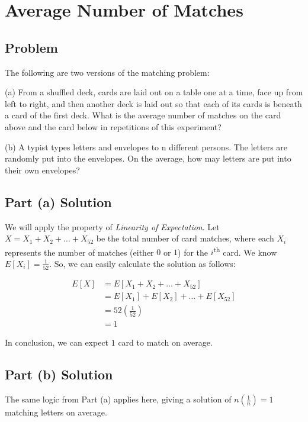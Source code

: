 \documentclass{article}
\date{}
\author{Kaan Aksoy | March 12, 2020}
\begin{document}
\maketitle
\section{Average Number of Matches}

\subsection{Problem}
The following are two versions of the matching problem:

(a) From a shuffled deck, cards are laid out on a table 
one at a time, face up from left to right, and then another 
deck is laid out so that each of its cards is beneath a 
card of the first deck. What is the average number of 
matches on the card above and the card below in repetitions 
of this experiment?

(b) A typist types letters and envelopes to n different persons. 
The letters are randomly put into the envelopes. On the 
average, how may letters are put into their own envelopes?				

\subsection{Part (a) Solution}

We will apply the property of \textit{Linearity of Expectation}.
Let $X = X_1 + X_2 + \ldots + X_{52}$ be the total number of 
card matches, where each $X_i$ represents the number of 
matches (either $0$ or $1$) for the $i$\textsuperscript{th} 
card. We know $E[X_i] = \frac{1}{52}$. So, we can easily 
calculate the solution as follows:

\begin{equation*}
\begin{split}
E[X] &= E[X_1 + X_2 + \ldots + X_{52}] \\
&= E[X_1] + E[X_2] + \ldots + E[X_{52}] \\
&= 52\left(\frac{1}{52}\right) \\
&= 1
\end{split}
\end{equation*}

In conclusion, we can expect $1$ card to match on average.

\subsection{Part (b) Solution}

The same logic from Part (a) applies here, giving a 
solution of $n\left(\frac{1}{n}\right) = 1$ matching 
letters on average.
\end{document}
